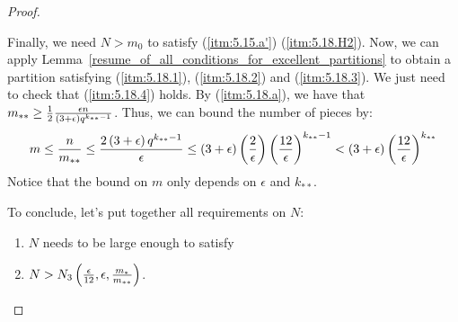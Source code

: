 \begin{proof}
\begin{itemize}[label={}]
            \end{itemize}
            Finally, we need $N > m_0$ to satisfy (\ref{itm:5.15.a'}) (\ref{itm:5.18.H2}).
            Now, we can apply Lemma~\ref{resume_of_all_conditions_for_excellent_partitions} to obtain a partition
            satisfying (\ref{itm:5.18.1}), (\ref{itm:5.18.2}) and (\ref{itm:5.18.3}).
            We just need to check that (\ref{itm:5.18.4}) holds.
            By (\ref{itm:5.18.a}), we have that $m_{**} \geq \frac{1}{2} \frac{\epsilon n}{\left( 3 + \epsilon \right)q^{k_{**}-1}}$.
            Thus, we can bound the number of pieces by:
            $$
                m \leq \frac{n}{m_{**}} \leq \frac{2 \left( 3 + \epsilon \right) q^{k_{**}-1}}{\epsilon} \leq
                    \left( 3 + \epsilon \right) \left( \frac{2}{\epsilon} \right) \left( \frac{12}{\epsilon} \right)^{k_{**}-1} <
                    \left( 3 + \epsilon \right) \left( \frac{12}{\epsilon} \right)^{k_{**}}
            $$
            Notice that the bound on $m$ only depends on $\epsilon$ and $k_{**}$.

            To conclude, let's put together all requirements on $N$:
            \begin{enumerate}[label=(H\arabic*), ref=H\arabic*]
                \item \label{itm:5.18.H1} $N$ needs to be large enough to satisfy
                \item \label{itm:5.18.H2} $N > N_3\left( \frac{\epsilon}{12}, \epsilon, \frac{m_*}{m_{**}} \right)$.
            \end{enumerate}
        \end{proof}

